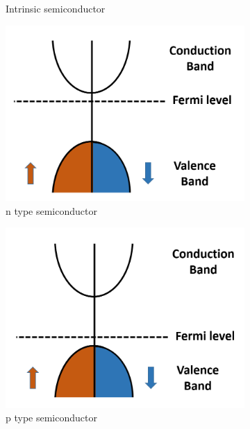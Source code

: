 \documentclass[main.tex]{subfiles}
\begin{document}
\begin{figure}[!htb]
\begin{subfigure}[h]{0.32\textwidth}
  		\caption{Intrinsic semiconductor}
  		\label{fig:sub-second}
	\end{subfigure}
	\begin{subfigure}[h]{0.32\textwidth}
  		\centering
  		\includegraphics[width=\linewidth]{dos_ntype_semiconductor}
  		\caption{n type semiconductor}
  		\label{fig:sub-second}
	\end{subfigure}
	\begin{subfigure}[h]{0.32\textwidth}
  		\centering
  		\includegraphics[width=\linewidth]{dos_ptype_semiconductor}
  		\caption{p type semiconductor}
  		\label{fig:sub-second}
	\end{subfigure}
	\begin{subfigure}[h]{0.32\textwidth}

\end{subfigure}
\end{figure}
\end{document}
